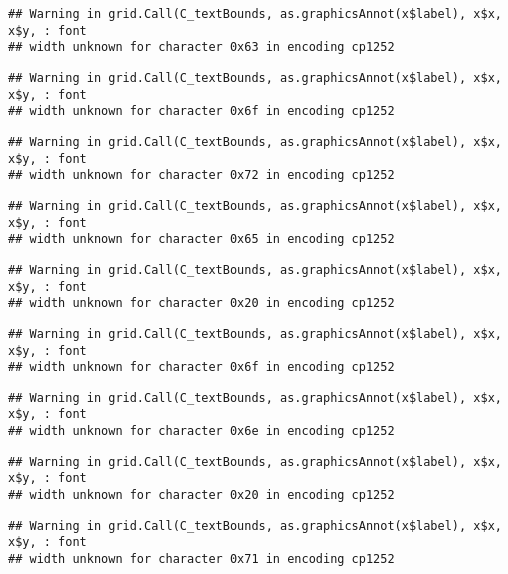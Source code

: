 \documentclass[
]{article}
\begin{document}
\begin{verbatim}
## Warning in grid.Call(C_textBounds, as.graphicsAnnot(x$label), x$x, x$y, : font
## width unknown for character 0x63 in encoding cp1252
\end{verbatim}

\begin{verbatim}
## Warning in grid.Call(C_textBounds, as.graphicsAnnot(x$label), x$x, x$y, : font
## width unknown for character 0x6f in encoding cp1252
\end{verbatim}

\begin{verbatim}
## Warning in grid.Call(C_textBounds, as.graphicsAnnot(x$label), x$x, x$y, : font
## width unknown for character 0x72 in encoding cp1252
\end{verbatim}

\begin{verbatim}
## Warning in grid.Call(C_textBounds, as.graphicsAnnot(x$label), x$x, x$y, : font
## width unknown for character 0x65 in encoding cp1252
\end{verbatim}

\begin{verbatim}
## Warning in grid.Call(C_textBounds, as.graphicsAnnot(x$label), x$x, x$y, : font
## width unknown for character 0x20 in encoding cp1252
\end{verbatim}

\begin{verbatim}
## Warning in grid.Call(C_textBounds, as.graphicsAnnot(x$label), x$x, x$y, : font
## width unknown for character 0x6f in encoding cp1252
\end{verbatim}

\begin{verbatim}
## Warning in grid.Call(C_textBounds, as.graphicsAnnot(x$label), x$x, x$y, : font
## width unknown for character 0x6e in encoding cp1252
\end{verbatim}

\begin{verbatim}
## Warning in grid.Call(C_textBounds, as.graphicsAnnot(x$label), x$x, x$y, : font
## width unknown for character 0x20 in encoding cp1252
\end{verbatim}

\begin{verbatim}
## Warning in grid.Call(C_textBounds, as.graphicsAnnot(x$label), x$x, x$y, : font
## width unknown for character 0x71 in encoding cp1252
\end{verbatim}
\end{document}
